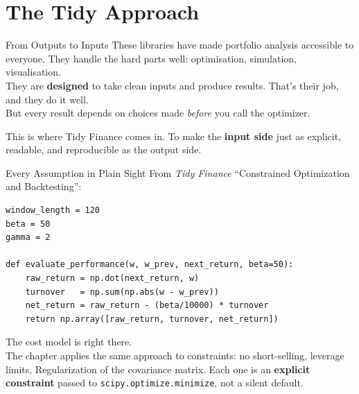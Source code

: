\documentclass[10pt, xcolor={x11names,table},compress]{beamer}
\begin{document}
\section{The Tidy Approach}
\begin{frame}{From Outputs to Inputs}
These libraries have made portfolio analysis accessible to everyone. They handle the hard parts well: optimisation, simulation, visualisation.\\[0.5em]
They are \textbf{designed} to take clean inputs and produce results. That's their job, and they do it well.\\[0.5em]
But every result depends on choices made \emph{before} you call the optimizer.
\vfill
\pause
\begin{gbox}{This is where Tidy Finance comes in.}
To make the \textbf{input side} just as explicit, readable, and reproducible as the output side.
\end{gbox}
\end{frame}

\begin{frame}[fragile]{Every Assumption in Plain Sight}
From \emph{Tidy Finance} ``Constrained Optimization and Backtesting'':
\begin{lstlisting}
window_length = 120
beta = 50
gamma = 2

def evaluate_performance(w, w_prev, next_return, beta=50):
    raw_return = np.dot(next_return, w)
    turnover   = np.sum(np.abs(w - w_prev))
    net_return = raw_return - (beta/10000) * turnover
    return np.array([raw_return, turnover, net_return])
\end{lstlisting}
\vfill
\small
The cost model is right there.\\[0.5em]
The chapter applies the same approach to constraints: no short-selling, leverage limits, Regularization of the covariance matrix. Each one is an \textbf{explicit constraint} passed to \texttt{scipy.optimize.minimize}, not a silent default.
\end{frame}
\end{document}
